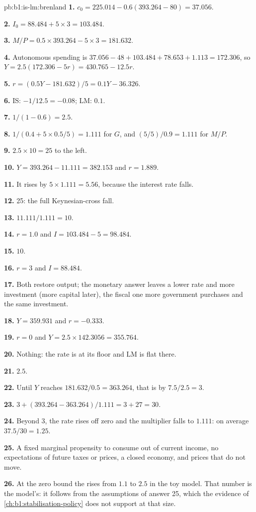 \begin{solution}{pb:b1:is-lm:brenland}
\textbf{1.} $c_0 = 225.014 - 0.6(393.264 - 80) = 37.056$.

\textbf{2.} $I_0 = 88.484 + 5 \times 3 = 103.484$.

\textbf{3.} $M/P = 0.5 \times 393.264 - 5 \times 3 = 181.632$.

\textbf{4.} Autonomous spending is $37.056 - 48 + 103.484 + 78.653 + 1.113 = 172.306$, so
$Y = 2.5(172.306 - 5r) = 430.765 - 12.5r$.

\textbf{5.} $r = (0.5Y - 181.632)/5 = 0.1Y - 36.326$.

\textbf{6.} IS: $-1/12.5 = -0.08$; LM: $0.1$.

\textbf{7.} $1/(1 - 0.6) = 2.5$.

\textbf{8.} $1/(0.4 + 5 \times 0.5/5) = 1.111$ for $G$, and $(5/5)/0.9 = 1.111$ for $M/P$.

\textbf{9.} $2.5 \times 10 = 25$ to the left.

\textbf{10.} $Y = 393.264 - 11.111 = 382.153$ and $r = 1.889$.

\textbf{11.} It rises by $5 \times 1.111 = 5.56$, because the interest rate falls.

\textbf{12.} 25: the full Keynesian-cross fall.

\textbf{13.} $11.111/1.111 = 10$.

\textbf{14.} $r = 1.0$ and $I = 103.484 - 5 = 98.484$.

\textbf{15.} $10$.

\textbf{16.} $r = 3$ and $I = 88.484$.

\textbf{17.} Both restore output; the monetary answer leaves a lower rate and
more investment (more capital later), the fiscal one more government
purchases and the same investment.

\textbf{18.} $Y = 359.931$ and $r = -0.333$.

\textbf{19.} $r = 0$ and $Y = 2.5 \times 142.3056 = 355.764$.

\textbf{20.} Nothing: the rate is at its floor and LM is flat there.

\textbf{21.} $2.5$.

\textbf{22.} Until $Y$ reaches $181.632/0.5 = 363.264$, that is by $7.5/2.5 = 3$.

\textbf{23.} $3 + (393.264 - 363.264)/1.111 = 3 + 27 = 30$.

\textbf{24.} Beyond 3, the rate rises off zero and the multiplier falls to
$1.111$: on average $37.5/30 = 1.25$.

\textbf{25.} A fixed marginal propensity to consume out of current income, no
expectations of future taxes or prices, a closed economy, and prices that
do not move.

\textbf{26.} At the zero bound the  rises from $1.1$ to $2.5$ in the
toy model. That number is the model's: it follows from the assumptions of
answer 25, which the evidence of \cref{ch:b1:stabilisation-policy} does not
support at that size.
\end{solution}
